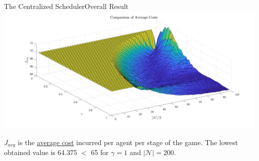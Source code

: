 \documentclass[aspectratio=169]{beamer}
\begin{document}
\begin{frame}{The Centralized Scheduler}{Overall Result}
\includegraphics[width=0.9\linewidth]{images/results_central_scheduler_plot.jpg}
\begin{block}{}
            \small{$J_{avg}$ is the \underline{average cost} incurred per agent per stage of the game. The lowest obtained value is 64.375 $<$ 65 for $\gamma =1$ and $|\mathcal{N}|=200$.}
        \end{block}
\end{frame}    
\end{document}
